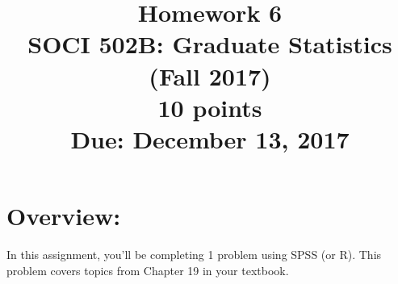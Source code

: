 \documentclass{article}
\begin{document}
\title{Homework 6\\ SOCI 502B: Graduate Statistics (Fall 2017) \\ {\large{10 points}} \\ {\large{Due: December 13, 2017}}}
\author[*]{}
\date{}
\maketitle



\section*{Overview:}
In this assignment, you'll be completing 1 problem using SPSS (or R). This problem covers topics from Chapter 19 in your textbook.
\end{document}
